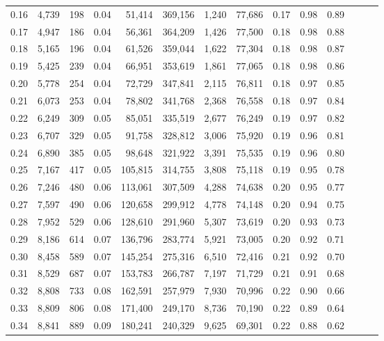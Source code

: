 \begin{tabular}{rrrrrrrrrrrrrr}
0.16 &  4,739 &    198 &  0.04 &   51,414 &  369,156 &   1,240 &  77,686 &  0.17 &  0.98 &      0.89 \\
0.17 &  4,947 &    186 &  0.04 &   56,361 &  364,209 &   1,426 &  77,500 &  0.18 &  0.98 &      0.88 \\
0.18 &  5,165 &    196 &  0.04 &   61,526 &  359,044 &   1,622 &  77,304 &  0.18 &  0.98 &      0.87 \\
0.19 &  5,425 &    239 &  0.04 &   66,951 &  353,619 &   1,861 &  77,065 &  0.18 &  0.98 &      0.86 \\
0.20 &  5,778 &    254 &  0.04 &   72,729 &  347,841 &   2,115 &  76,811 &  0.18 &  0.97 &      0.85 \\
0.21 &  6,073 &    253 &  0.04 &   78,802 &  341,768 &   2,368 &  76,558 &  0.18 &  0.97 &      0.84 \\
0.22 &  6,249 &    309 &  0.05 &   85,051 &  335,519 &   2,677 &  76,249 &  0.19 &  0.97 &      0.82 \\
0.23 &  6,707 &    329 &  0.05 &   91,758 &  328,812 &   3,006 &  75,920 &  0.19 &  0.96 &      0.81 \\
0.24 &  6,890 &    385 &  0.05 &   98,648 &  321,922 &   3,391 &  75,535 &  0.19 &  0.96 &      0.80 \\
0.25 &  7,167 &    417 &  0.05 &  105,815 &  314,755 &   3,808 &  75,118 &  0.19 &  0.95 &      0.78 \\
0.26 &  7,246 &    480 &  0.06 &  113,061 &  307,509 &   4,288 &  74,638 &  0.20 &  0.95 &      0.77 \\
0.27 &  7,597 &    490 &  0.06 &  120,658 &  299,912 &   4,778 &  74,148 &  0.20 &  0.94 &      0.75 \\
0.28 &  7,952 &    529 &  0.06 &  128,610 &  291,960 &   5,307 &  73,619 &  0.20 &  0.93 &      0.73 \\
0.29 &  8,186 &    614 &  0.07 &  136,796 &  283,774 &   5,921 &  73,005 &  0.20 &  0.92 &      0.71 \\
0.30 &  8,458 &    589 &  0.07 &  145,254 &  275,316 &   6,510 &  72,416 &  0.21 &  0.92 &      0.70 \\
0.31 &  8,529 &    687 &  0.07 &  153,783 &  266,787 &   7,197 &  71,729 &  0.21 &  0.91 &      0.68 \\
0.32 &  8,808 &    733 &  0.08 &  162,591 &  257,979 &   7,930 &  70,996 &  0.22 &  0.90 &      0.66 \\
0.33 &  8,809 &    806 &  0.08 &  171,400 &  249,170 &   8,736 &  70,190 &  0.22 &  0.89 &      0.64 \\
0.34 &  8,841 &    889 &  0.09 &  180,241 &  240,329 &   9,625 &  69,301 &  0.22 &  0.88 &      0.62 \\

\end{tabular}
